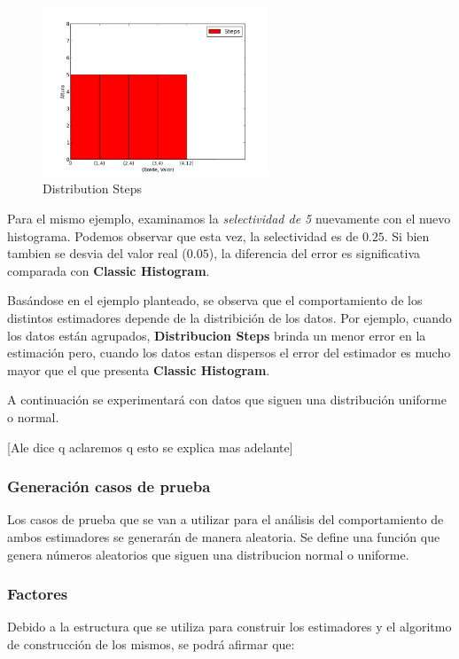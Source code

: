 \documentclass[10pt, a4paper,english,spanish,hidelinks]{article}
\begin{document}
\begin{figure}[h!]
  \centering
  \includegraphics[width=0.6\textwidth]{./imagenes/ejb1_ejemplo_steps.png}
  \caption{Distribution Steps}
\end{figure}


Para el mismo ejemplo, examinamos la \textit{selectividad de 5} nuevamente con el nuevo histograma.
Podemos observar que esta vez, la selectividad es de $0.25$. Si bien tambien se desvia del
valor real ($0.05$), la diferencia del error es significativa comparada con \textbf{Classic Histogram}.


Basándose en el ejemplo planteado, se observa que el comportamiento de los distintos estimadores
depende de la distribición de los datos.
Por ejemplo, cuando los datos están agrupados, \textbf{Distribucion Steps} brinda un menor
error en la estimación pero, cuando los datos estan dispersos el error del estimador es
mucho mayor que el que presenta \textbf{Classic Histogram}.

A continuación se experimentará con datos que siguen una distribución uniforme o normal.


[Ale dice q aclaremos q esto se explica mas adelante]


\subsubsection{Generación casos de prueba}
Los casos de prueba que se van a utilizar para el análisis del comportamiento de ambos
estimadores se generarán de manera aleatoria. Se define una función que genera números
aleatorios que siguen una distribucion normal o uniforme.



\subsubsection{Factores}

Debido a la estructura que se utiliza para construir los estimadores y el algoritmo de
construcción de los mismos, se podrá afirmar que:
\end{document}
